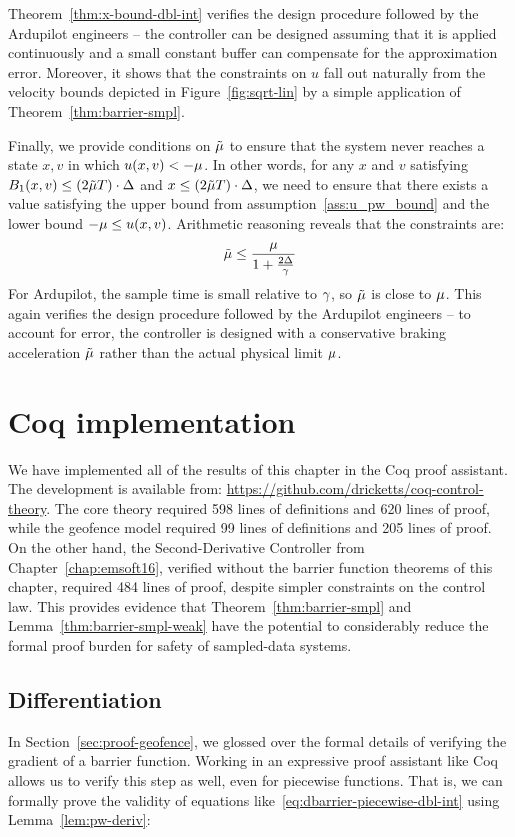 Theorem~\ref{thm:x-bound-dbl-int} verifies the design procedure followed by
the Ardupilot engineers -- the controller can be designed assuming that it
is applied continuously and a small constant buffer can compensate for the
approximation error. Moreover, it shows that the constraints on $u$ fall
out naturally from the velocity bounds depicted in
Figure~\ref{fig:sqrt-lin} by a simple application of
Theorem~\ref{thm:barrier-smpl}.

Finally, we provide conditions on $\tilde{\mu}$ to ensure that the system never
reaches a state $x,v$ in which $u(x,v) < -\mu$. In other words, for any
$x$ and $v$ satisfying $B_1 (x,v) \leq (2\tilde{\mu} T) \cdot \Delta$ and $x \leq
(2\tilde{\mu} T) \cdot \Delta$, we need to ensure that there exists a value
satisfying the upper bound from assumption~\ref{ass:u_pw_bound} and the
lower bound $-\mu \leq u(x,v)$. Arithmetic reasoning reveals that the
constraints are:
\begin{equation}
\tilde{\mu} \leq \frac{\mu}{1 + \frac{2\Delta}{\gamma}}
\end{equation}
For Ardupilot, the sample time is small relative to $\gamma$, so $\tilde{\mu}$ is
close to $\mu$. This again verifies the design procedure followed by the
Ardupilot engineers -- to account for error, the controller is designed
with a conservative braking acceleration $\tilde{\mu}$ rather than the actual
physical limit $\mu$.

\section{Coq implementation}
\label{sec:coq}
We have implemented all of the results of this chapter in the Coq proof
assistant. The development is available from:
\url{https://github.com/dricketts/coq-control-theory}. The core theory
required 598 lines of definitions and 620 lines of proof, while the
geofence model required 99 lines of definitions and 205 lines of proof. On
the other hand, the Second-Derivative Controller from
Chapter~\ref{chap:emsoft16}, verified without the barrier function theorems
of this chapter, required 484 lines of proof, despite simpler constraints
on the control law. This provides evidence that
Theorem~\ref{thm:barrier-smpl} and Lemma~\ref{thm:barrier-smpl-weak} have
the potential to considerably reduce the formal proof burden for safety of
sampled-data systems.

\subsection{Differentiation}
\label{sec:differentiation}
In Section~\ref{sec:proof-geofence}, we glossed over the formal details of
verifying the gradient of a barrier function. Working in an expressive
proof assistant like Coq allows us to verify this step as well, even for
piecewise functions. That is, we can formally prove the validity of
equations like~\eqref{eq:dbarrier-piecewise-dbl-int} using
Lemma~\ref{lem:pw-deriv}:

